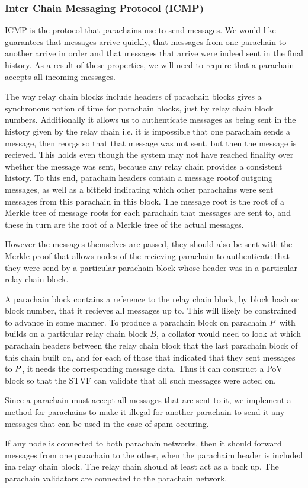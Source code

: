 \subsubsection{Inter Chain Messaging Protocol (ICMP)} \label{sec:ICMP}

ICMP is the protocol that parachains use to send messages. We would like guarantees that messages arrive quickly, that messages from one parachain to another arrive in order and that messages that arrive were indeed sent in the final history. As a result of these properties, we will need to require that a parachain accepts all incoming messages. 

The way relay chain blocks include headers of parachain blocks gives a synchronous notion of time for parachain blocks, just by relay chain block numbers. Additionally it allows us to authenticate messages as being sent in the history given by the relay chain i.e. it is impossible that one parachain sends a message, then reorgs so that that message was not sent, but then the message is recieved. This holds even though the system may not have reached finality over whether the message was sent, because any relay chain provides a consistent history. To this end, parachain headers contain a message rootof outgoing messages, as well as a bitfield indicating which other parachains were sent messages from this parachain in this block. The message root is the root of a Merkle tree of message roots for each parachain that messages are sent to, and these in turn are the root of a Merkle tree of the actual messages.

However the messages themselves are passed, they should also be sent with the Merkle proof that allows nodes of the recieving parachain to authenticate that they were send by a particular parachain block whose header was in a particular relay chain block.

A parachain block contains a reference to the relay chain block, by block hash or block number, that it recieves all messages up to. This will likely be constrained to advance in some manner. To produce a parachain block on parachain $P$ with builds on a particular relay chain block $B$, a collator would need to look at which parachain headers between the relay chain block that the last parachain block of this chain built on, and for each of those that indicated that they sent messages to $P$, it needs the corresponding message data. Thus it can construct a PoV block so that the STVF can validate that all such messages were acted on.

Since a parachain must accept all messages that are sent to it, we implement a method for parachains to make it illegal for another parachain to send it any messages that can be used in the case of spam occuring.

If any node is connected to both parachain networks, then it should forward messages from one parachain to the other, when the parachaim header is included ina relay chain block. The relay chain should at least act as a back up. The parachain validators are connected to the parachain network. 







